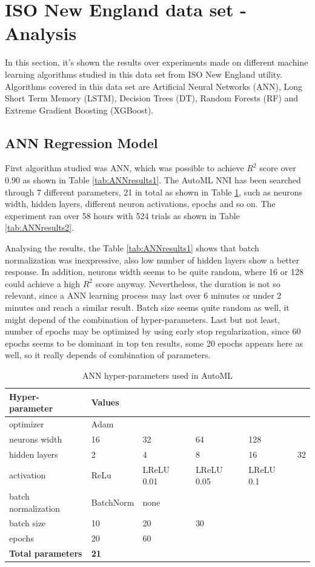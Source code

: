 \section{ISO New England data set - Analysis} \label{section:ISO New England data set - Analysis}
In this section, it's shown the results over experiments made on different machine learning algorithms studied in this data set from ISO New England utility. Algorithms covered in this data set are Artificial Neural Networks (ANN), Long Short Term Memory (LSTM), Decision Trees (DT), Random Forests (RF) and Extreme Gradient Boosting (XGBoost).


\subsection{ANN Regression Model} \label{subsection:ANN Regression Model}
First algorithm studied was ANN, which was possible to achieve $R^2$ score over $0.90$ as shown in Table \ref{tab:ANNresults1}. The AutoML NNI has been searched through 7 different parameters, 21 in total as shown in Table \ref{tab:ANNparams}, such as neurons width, hidden layers, different neuron activations, epochs and so on. The experiment ran over 58 hours with 524 trials as shown in Table \ref{tab:ANNresults2}.

Analysing the results, the Table \ref{tab:ANNresults1} shows that batch normalization was inexpressive, also low number of hidden layers show a better response. In addition, neurons width seems to be quite random, where 16 or 128 could achieve a high $R^2$ score anyway. Nevertheless, the duration is not so relevant, since a ANN learning process may last over 6 minutes or under 2 minutes and reach a similar result. Batch size seems quite random as well, it might depend of the combination of hyper-parameters. Last but not least, number of epochs may be optimized by using early stop regularization, since 60 epochs seems to be dominant in top ten results, some 20 epochs appears here as well, so it really depends of combination of parameters.


\begin{table}[!htpb]
\small
\centering
\caption{ANN hyper-parameters used in AutoML}
\label{tab:ANNparams}
\begin{tabular}{llllll} \hline
\textbf{Hyper-parameter} & \textbf{Values} & \textbf{} &  &  &  \\ \hline
optimizer & Adam &  &  &  &  \\
neurons width & 16 & 32 & 64 & 128 &  \\
hidden layers & 2 & 4 & 8 & 16 & 32 \\
activation & ReLu & LReLU 0.01 & LReLU 0.05 & LReLU 0.1 &  \\
batch normalization & BatchNorm & none &  &  &  \\
batch size & 10 & 20 & 30 &  &  \\
epochs & 20 & 60 &  &  &  \\
\textbf{Total parameters} & \textbf{21} &  &  &  & \\ \hline
\end{tabular}
\end{table}


